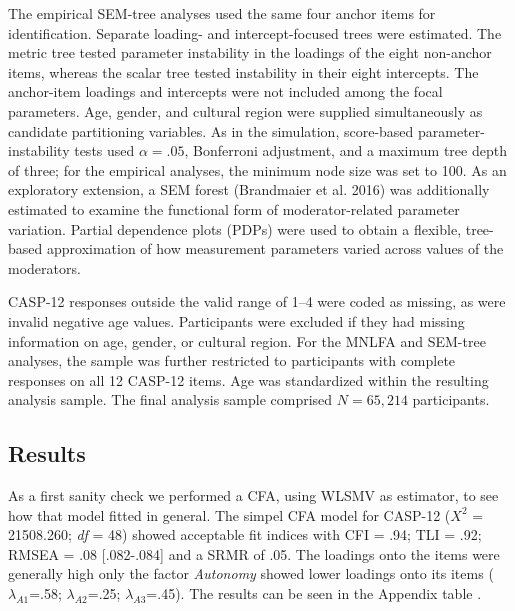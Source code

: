 \documentclass[
  man,
  floatsintext]{apa7}
\begin{document}
The empirical SEM-tree analyses used the same four anchor items for
identification. Separate loading- and intercept-focused trees were
estimated. The metric tree tested parameter instability in the loadings
of the eight non-anchor items, whereas the scalar tree tested
instability in their eight intercepts. The anchor-item loadings and
intercepts were not included among the focal parameters. Age, gender,
and cultural region were supplied simultaneously as candidate
partitioning variables. As in the simulation, score-based
parameter-instability tests used \(\alpha=.05\), Bonferroni adjustment,
and a maximum tree depth of three; for the empirical analyses, the
minimum node size was set to 100. As an exploratory extension, a SEM
forest (Brandmaier et al. 2016) was additionally estimated to examine
the functional form of moderator-related parameter variation. Partial
dependence plots (PDPs) were used to obtain a flexible, tree-based
approximation of how measurement parameters varied across values of the
moderators.

CASP-12 responses outside the valid range of 1--4 were coded as missing,
as were invalid negative age values. Participants were excluded if they
had missing information on age, gender, or cultural region. For the
MNLFA and SEM-tree analyses, the sample was further restricted to
participants with complete responses on all 12 CASP-12 items. Age was
standardized within the resulting analysis sample. The final analysis
sample comprised \(N=65{,}214\) participants.

\subsection{Results}\label{results-1}

As a first sanity check we performed a CFA, using WLSMV as estimator, to
see how that model fitted in general. The simpel CFA model for CASP-12
(\(X^2\) = 21508.260; \emph{df} = 48) showed acceptable fit indices with
CFI = .94; TLI = .92; RMSEA = .08 {[}.082-.084{]} and a SRMR of .05. The
loadings onto the items were generally high only the factor
\emph{Autonomy} showed lower loadings onto its items
(\(\lambda_{A1}\)=.58; \(\lambda_{A2}\)=.25; \(\lambda_{A3}\)=.45). The
results can be seen in the Appendix table .
\end{document}
